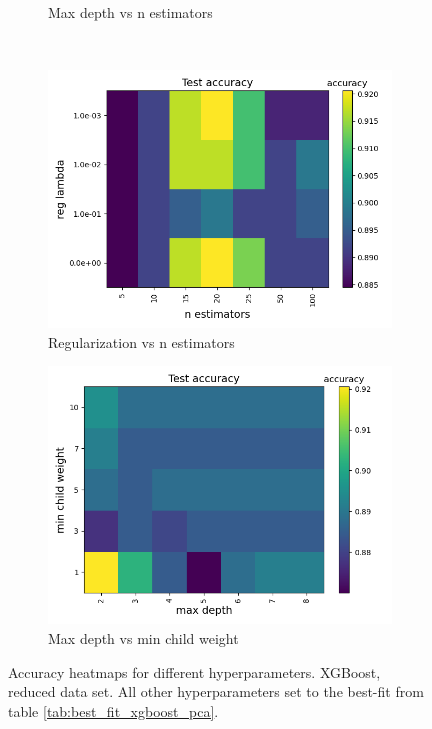 \documentclass[a4paper]{article}
\begin{document}
\begin{figure}[H]
\begin{subfigure}{0.49\textwidth}
    \caption{Max depth vs n estimators}
  \end{subfigure}\\
  \begin{subfigure}{0.49\textwidth}
    \includegraphics[scale=0.45]{../figures/xgboost/heatmaps/heatmap_nbins200_pca35_seed4155_ts0.20_accuracy_n_estimators_reg_lambda.png}
    \caption{Regularization vs n estimators}
  \end{subfigure}
  \begin{subfigure}{0.49\textwidth}
    \includegraphics[scale=0.45]{../figures/xgboost/heatmaps/heatmap_nbins200_pca35_seed4155_ts0.20_accuracy_max_depth_min_child_weight.png}
    \caption{Max depth vs min child weight}
  \end{subfigure}
  \caption{Accuracy heatmaps for different hyperparameters. XGBoost, reduced data set. All other hyperparameters set to the best-fit from table \ref{tab:best_fit_xgboost_pca}.}
  \label{fig:app_xgboost_pca}
\end{figure}
\end{document}
